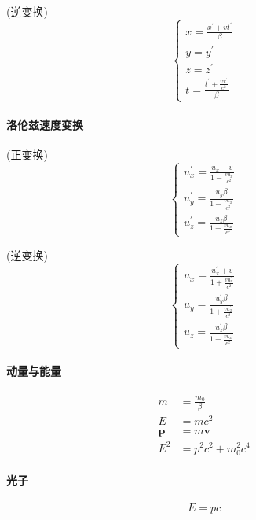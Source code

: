 \documentclass[12pt,a4paper]{article}
\numberwithin{equation}{section}
\begin{document}
\begin{CJK}{UTF8}{gbsn}
(逆变换)
\begin{equation}
\left\{
  \begin{array}{ll}
    x=\frac{x^{\prime}+vt^{\prime}}{\beta} \\
    y=y^{\prime} \\
    z=z^{\prime} \\
    t=\frac{t^{\prime}+\frac{vx^{\prime}}{c^2}}{\beta}
  \end{array}
\right.
\end{equation}

\paragraph{洛伦兹速度变换\\}
(正变换)
\begin{equation}
\left\{
  \begin{array}{ll}
    u_x^{\prime}=\frac{u_x-v}{1-\frac{vu_x}{c^2}} \\
    u_y^{\prime}=\frac{u_y\beta}{1-\frac{vu_x}{c^2}} \\
    u_z^{\prime}=\frac{u_z\beta}{1-\frac{vu_x}{c^2}}
  \end{array}
\right.
\end{equation}

(逆变换)
\begin{equation}
\left\{
  \begin{array}{ll}
    u_x=\frac{u_x^{\prime}+v}{1+\frac{vu_x^{\prime}}{c^2}} \\
    u_y=\frac{u_y^{\prime}\beta}{1+\frac{vu_x^{\prime}}{c^2}} \\
    u_z=\frac{u_z^{\prime}\beta}{1+\frac{vu_x^{\prime}}{c^2}}
  \end{array}
\right.
\end{equation}

\paragraph{动量与能量}
\begin{align}
  m&=\frac{m_0}{\beta} \\
  E&=mc^2 \\
  \bm{p}&=m\bm{v} \\
  E^2&=p^2c^2+m_0^2c^4
\end{align}

\paragraph{光子}
\begin{equation}
  E=pc
\end{equation}


\end{CJK}
\end{document}
